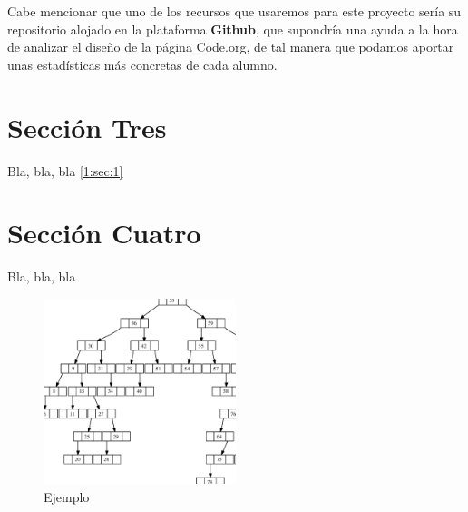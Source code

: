Cabe mencionar que uno de los recursos que usaremos para este proyecto sería su repositorio alojado en la plataforma \textbf{Github}, que supondría una ayuda a la hora de analizar el diseño de la página Code.org, de tal manera que podamos aportar unas estadísticas más concretas de cada alumno.

\section{Sección Tres}
\label{1:sec:3}

Bla, bla, bla  \ref{1:sec:1}

\section{Sección Cuatro}
\label{1:sec:4}

Bla, bla, bla

\begin{figure}[!th]
\begin{center}
\includegraphics[width=0.5\textwidth]{images/arbolbinario.eps}
\caption{Ejemplo}
\label{fig:ArbolBinario}
\end{center}
\end{figure}

